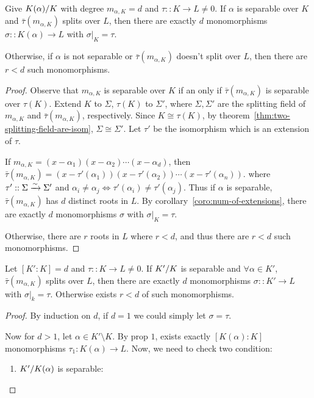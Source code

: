 \begin{prop}
  Give ${K(\alpha)}/{K}$ with degree $m_{\alpha, K} = d$ and $\tau :: K \to L \neq 0$.
  If $\alpha$ is separable over $K$ and $\bar\tau(m_{\alpha, K})$ splits over $L$, then
  there are exactly $d$ monomorphisms $\sigma :: K(\alpha) \to L$ with $\sigma\big|_K = \tau$.

  Otherwise, if $\alpha$ is not separable or $\bar\tau(m_{\alpha, K})$ doesn't split over $L$,
  then there are $r < d$ such monomorphisms.

  \begin{proof}
    Observe that $m_{\alpha, K}$ is separable over $K$ if an only if $\bar\tau(m_{\alpha, K})$ is separable over $\tau(K)$.
    Extend $K$ to $\Sigma$, $\tau(K)$ to $\Sigma'$, where $\Sigma, \Sigma'$ are the splitting
    field of $m_{\alpha, K}$ and $\bar\tau(m_{\alpha, K})$, respectively.
    Since $K \cong \tau(K)$, by theorem~\ref{thm:two-splitting-field-are-isom}, $\Sigma \cong \Sigma'$.
    Let $\tau'$ be the isomorphism which is an extension of $\tau$.

    If $m_{\alpha, K} = (x - \alpha_1) (x - \alpha_2) \cdots (x - \alpha_d)$, then
    $\bar\tau(m_{\alpha, K}) = (x - \tau'(\alpha_1)) (x - \tau'(\alpha_2)) \cdots (x - \tau'(\alpha_n))$.
    where $\tau' :: \Sigma \xrightarrow{\sim} \Sigma'$ and $\alpha_i \neq \alpha_j \iff \tau'(\alpha_i) \neq \tau'(\alpha_j)$.
    Thus if $\alpha$ is separable, $\bar\tau(m_{\alpha, K})$ has $d$ distinct roots in $L$.
    By corollary~\ref{coro:num-of-extensions}, there are exactly $d$ monomorphisms $\sigma$ with $\sigma\big|_K = \tau$.

    Otherwise, there are $r$ roots in $L$ where $r < d$, and thus there are $r < d$ such monomorphisms.
  \end{proof}
\end{prop}

\begin{prop}
  Let $[K': K] = d$ and $\tau:: K \to L \neq 0$. If ${K'}/{K}$ is separable and $\forall \alpha \in K'$,
  $\bar\tau(m_{\alpha, K})$ splits over $L$, then there are exactly $d$ monomorphisms $\sigma::K' \to L$ with
  $\sigma\big|_k = \tau$. Otherwise exists $r < d$ of such monomorphisms.

  \begin{proof}
    By induction on $d$, if $d = 1$ we could simply let $\sigma = \tau$.

    Now for $d > 1$, let $\alpha \in K' \setminus K$.
    By prop $1$, exists exactly $[K(\alpha): K]$ monomorphisms $\tau_1: K(\alpha) \to L$.
    Now, we need to check two condition:
    \begin{enumerate}
        \item ${K'}/{K(\alpha)}$ is separable:
    \end{enumerate}
  \end{proof}
\end{prop}

